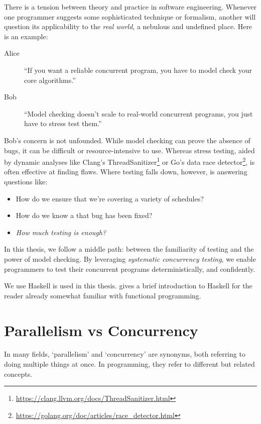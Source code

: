 There is a tension between theory and practice in software
engineering.  Whenever one programmer suggests some sophisticated
technique or formalism, another will question its applicability to the
\emph{real world}, a nebulous and undefined place.  Here is an
example:

\begin{description}
\item[Alice] ``If you want a reliable concurrent program, you have to
  model check your core algorithms.''
\item[Bob] ``Model checking doesn't scale to real-world concurrent
  programs, you just have to stress test them.''
\end{description}

Bob's concern is not unfounded.  While model checking can prove the
absence of bugs, it can be difficult or resource-intensive to use.
Whereas stress testing, aided by dynamic analyses like Clang's
ThreadSanitizer\footnote{\url{https://clang.llvm.org/docs/ThreadSanitizer.html}}
or Go's data race
detector\footnote{\url{https://golang.org/doc/articles/race_detector.html}},
is often effective at finding flaws.  Where testing falls down,
however, is answering questions like:

\begin{itemize}
\item How do we ensure that we're covering a variety of schedules?
\item How do we know a that bug has been fixed?
\item \emph{How much testing is enough?}
\end{itemize}

In this thesis, we follow a middle path: between the familiarity of
testing and the power of model checking.  By leveraging
\emph{systematic concurrency testing}, we enable programmers to test
their concurrent programs deterministically, and confidently.

We use Haskell is used in this thesis.   gives a
brief introduction to Haskell for the reader already somewhat familiar
with functional programming.

\section{Parallelism vs Concurrency}
\label{sec:intro-parconc}

In many fields, `parallelism' and `concurrency' are synonyms, both
referring to doing multiple things at once.  In programming, they
refer to different but related concepts.

